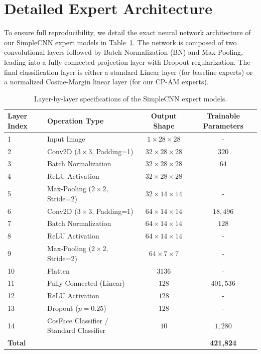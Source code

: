 \documentclass{article}
\theoremstyle{plain}
\theoremstyle{definition}
\theoremstyle{remark}
\begin{document}
\section{Detailed Expert Architecture}
To ensure full reproducibility, we detail the exact neural network architecture of our SimpleCNN expert models in Table~\ref{tab:appendix_arch}. The network is composed of two convolutional layers followed by Batch Normalization (BN) and Max-Pooling, leading into a fully connected projection layer with Dropout regularization. The final classification layer is either a standard Linear layer (for baseline experts) or a normalized Cosine-Margin linear layer (for our CP-AM experts).

\begin{table}[h]
\caption{Layer-by-layer specifications of the SimpleCNN expert models.}
\label{tab:appendix_arch}
\vskip 0.1in
\begin{center}
\begin{small}
\begin{tabular}{llcc}
\toprule
Layer Index & Operation Type & Output Shape & Trainable Parameters \\
\midrule
1 & Input Image & $1 \times 28 \times 28$ & - \\
2 & Conv2D ($3\times3$, Padding=1) & $32 \times 28 \times 28$ & $320$ \\
3 & Batch Normalization & $32 \times 28 \times 28$ & $64$ \\
4 & ReLU Activation & $32 \times 28 \times 28$ & - \\
5 & Max-Pooling ($2\times2$, Stride=2) & $32 \times 14 \times 14$ & - \\
6 & Conv2D ($3\times3$, Padding=1) & $64 \times 14 \times 14$ & $18,496$ \\
7 & Batch Normalization & $64 \times 14 \times 14$ & $128$ \\
8 & ReLU Activation & $64 \times 14 \times 14$ & - \\
9 & Max-Pooling ($2\times2$, Stride=2) & $64 \times 7 \times 7$ & - \\
10 & Flatten & $3136$ & - \\
11 & Fully Connected (Linear) & $128$ & $401,536$ \\
12 & ReLU Activation & $128$ & - \\
13 & Dropout ($p=0.25$) & $128$ & - \\
14 & CosFace Classifier / Standard Classifier & $10$ & $1,280$ \\
\midrule
\textbf{Total} & & & \textbf{421,824} \\
\bottomrule
\end{tabular}
\end{small}
\end{center}
\vskip -0.1in
\end{table}
\end{document}
